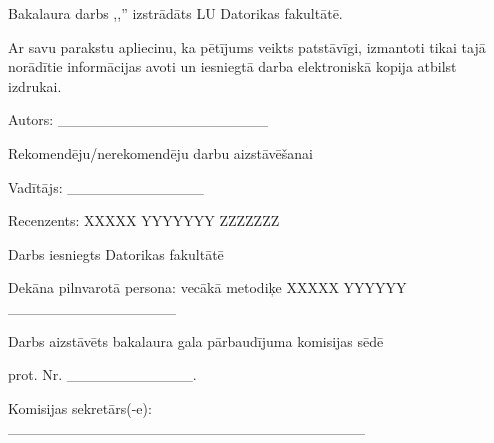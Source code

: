 \newcommand{\makedocpagee}{
		\thispagestyle{empty} 
		Bakalaura darbs ,,\@nosaukums''
		izstrādāts LU Datorikas fakultātē.
		\vspace{3cm} 
		
		Ar savu parakstu apliecinu, ka pētījums veikts patstāvīgi, 
		izmantoti tikai tajā norādītie informācijas avoti un iesniegtā darba elektroniskā kopija atbilst izdrukai.

		Autors: \_\_\_\_\_\_\_\_\_\_\_\_\_\_\_\_\_\_\_\_
		{\@autors}
		\vspace{3cm} 
		
		Rekomendēju/nerekomendēju darbu aizstāvēšanai

		Vadītājs: {\@vaditajs} 
		\_\_\_\_\_\_\_\_\_\_\_\_\_ {\@datums}
		
		\vspace{2.5cm} 
		{\raggedright
		Recenzents: XXXXX YYYYYYY ZZZZZZZ}

		\vspace{3cm}
		Darbs iesniegts Datorikas fakultātē  {\@datums}

		Dekāna pilnvarotā persona: vecākā metodiķe XXXXX YYYYYY \_\_\_\_\_\_\_\_\_\_\_\_\_\_\_\_
		\vspace{3cm} 
		
		Darbs aizstāvēts bakalaura gala pārbaudījuma komisijas sēdē

		{\@datums} prot. Nr.
		\_\_\_\_\_\_\_\_\_\_\_\_.

		Komisijas sekretārs(-e):  \_\_\_\_\_\_\_\_\_\_\_\_\_\_\_\_\_\_\_\_\_\_\_\_\_\_\_\_\_\_\_\_\_\_
}
\makedocpagee